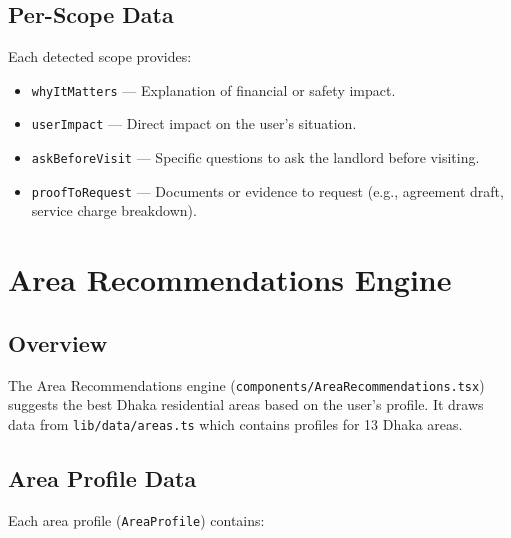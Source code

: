 \documentclass[12pt, a4paper, oneside]{report}
\newcommand{\filepath}[1]{\texttt{\small\color{codeblue}#1}}
\newcommand{\typename}[1]{\texttt{\small\color{codeblue}#1}}
\begin{document}
\section{Per-Scope Data}

Each detected scope provides:

\begin{itemize}[leftmargin=2em]
  \item \texttt{whyItMatters} --- Explanation of financial or safety impact.
  \item \texttt{userImpact} --- Direct impact on the user's situation.
  \item \texttt{askBeforeVisit} --- Specific questions to ask the landlord before visiting.
  \item \texttt{proofToRequest} --- Documents or evidence to request (e.g., agreement draft, service charge breakdown).
\end{itemize}


\chapter{Area Recommendations Engine}

\section{Overview}

The Area Recommendations engine (\filepath{components/AreaRecommendations.tsx}) suggests the best Dhaka residential areas based on the user's profile. It draws data from \filepath{lib/data/areas.ts} which contains profiles for 13 Dhaka areas.

\section{Area Profile Data}

Each area profile (\typename{AreaProfile}) contains:
\end{document}
